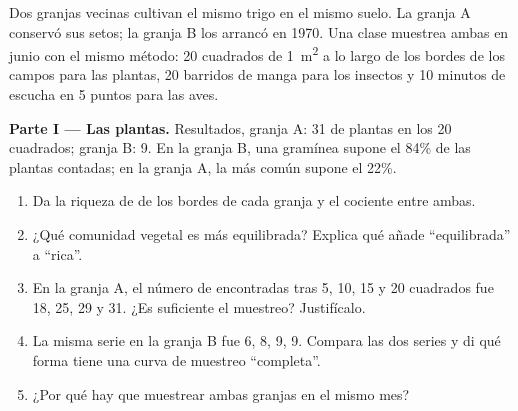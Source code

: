 \begin{problem}
\label{pb:g10:biodiversity-scales:1}
Dos granjas vecinas cultivan el mismo trigo en el mismo suelo. La
granja A conservó sus setos; la granja B los arrancó en 1970. Una clase
muestrea ambas en junio con el mismo método: 20 cuadrados de
\qty{1}{m^2} a lo largo de los bordes de los campos para las plantas,
20 barridos de manga para los insectos y 10 minutos de escucha en 5
puntos para las aves.

\medskip
\noindent\textbf{Parte I --- Las plantas.}
Resultados, granja A: 31  de plantas en los 20 cuadrados;
granja B: 9. En la granja B, una gramínea supone el 84\% de las plantas
contadas; en la granja A, la  más común supone el 22\%.
\begin{enumerate}
  \item Da la riqueza de  de los bordes de cada granja y el
        cociente entre ambas.
  \item ¿Qué comunidad vegetal es más equilibrada? Explica qué añade
        ``equilibrada'' a ``rica''.
  \item En la granja A, el número de  encontradas tras 5, 10,
        15 y 20 cuadrados fue 18, 25, 29 y 31. ¿Es suficiente el
        muestreo? Justifícalo.
  \item La misma serie en la granja B fue 6, 8, 9, 9. Compara las dos
        series y di qué forma tiene una curva de muestreo
        ``completa''.
  \item ¿Por qué hay que muestrear ambas granjas en el mismo mes?
\end{enumerate}


\end{problem}
